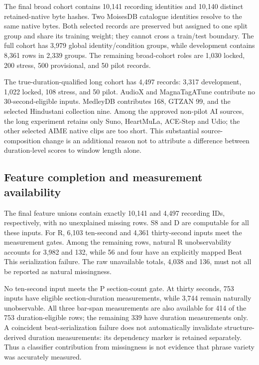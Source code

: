 The final broad cohort contains 10,141 recording identities and 10,140 distinct
retained-native byte hashes. Two MoisesDB catalogue identities resolve to the
same native bytes. Both selected records are preserved but assigned to one split
group and share its training weight; they cannot cross a train/test boundary.
The full cohort has 3,979 global identity/condition groups, while development
contains 8,361 rows in 2,339 groups. The remaining broad-cohort roles are 1,030
locked, 200 stress, 500 provisional, and 50 pilot records.

The true-duration-qualified long cohort has 4,497 records: 3,317 development,
1,022 locked, 108 stress, and 50 pilot. AudioX and MagnaTagATune contribute no
30-second-eligible inputs. MedleyDB contributes 168, GTZAN 99, and the selected
Hindustani collection nine. Among the approved non-pilot AI sources, the long experiment
retains only Suno, HeartMuLa, ACE-Step and Udio; the other selected AIME native
clips are too short. This substantial source-composition change is an additional
reason not to attribute a difference between duration-level scores to window
length alone.



\subsection{Feature completion and measurement availability}

The final feature unions contain exactly 10,141 and 4,497 recording IDs,
respectively, with no unexplained missing rows. S8 and D are computable for all
these inputs. For R, 6,103 ten-second and 4,361 thirty-second inputs meet the
measurement gates. Among the remaining rows, natural R unobservability accounts
for 3,982 and 132, while 56 and four have an explicitly mapped Beat This
serialization failure. The raw unavailable totals, 4,038 and 136, must not all
be reported as natural missingness.

No ten-second input meets the P section-count gate. At thirty seconds, 753
inputs have eligible section-duration measurements, while 3,744 remain naturally
unobservable. All three bar-span measurements are also available for 414 of the
753 duration-eligible rows; the remaining 339 have duration measurements only.
A coincident beat-serialization failure
does not automatically invalidate structure-derived duration measurements: its
dependency marker is retained separately. Thus a classifier contribution from
missingness is not evidence that phrase variety was accurately measured.

